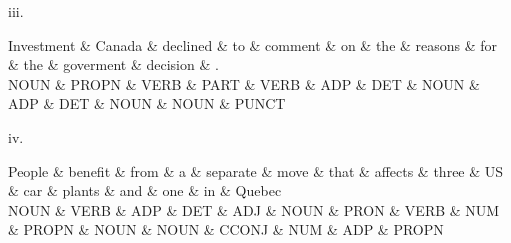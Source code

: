 iii. \\
\begin{center}
 {\small

 \begin{dependency}[] 
 \begin{deptext}
Investment \& Canada \& declined \& to \& comment \& on \& the \& reasons \& for \& the \& goverment \& decision \& . \\
NOUN \& PROPN \& VERB \& PART \& VERB \& ADP \& DET \& NOUN \& ADP \& DET \& NOUN \& NOUN \& PUNCT \\
\end{deptext}
\end{dependency}

 }
 \end{center}

iv. \\
 \begin{center}
 {\small
 \begin{dependency}[] 
 \begin{deptext}
People \& benefit \& from \& a \& separate \& move \& that \& affects \& three \& US \& car \& plants \& and \& one \& in \& Quebec \\
NOUN \& VERB \& ADP \& DET \& ADJ \& NOUN \& PRON \& VERB \& NUM \& PROPN \& NOUN \& NOUN \& CCONJ \& NUM \& ADP \& PROPN \\
\end{deptext}
\end{dependency}
 }
 \end{center}